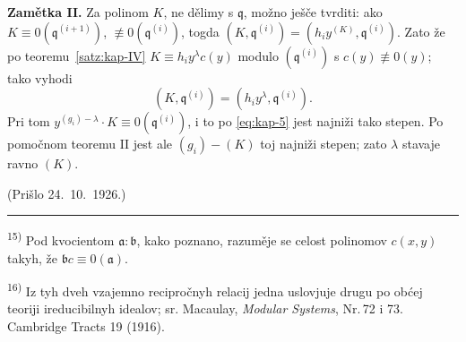 \documentclass[11pt]{article}
\newcommand{\foreign}[1]{#1}
\theoremstyle{plain}
\begin{document}
\textbf{Zamětka II.} Za polinom $K$, ne dělimy s $\mathfrak{q}$,
možno ješče tvrditi: ako
$K \equiv 0(\mathfrak{q}^{(i+1)})$,
$\not\equiv 0(\mathfrak{q}^{(i)})$, togda
$(K, \mathfrak{q}^{(i)}) = (h_{i}y^{(K)}, \mathfrak{q}^{(i)})$.
Zato že po teoremu~\ref{satz:kap-IV}
$K \equiv h_{i}y^{\lambda}c(y)$ modulo
$(\mathfrak{q}^{(i)})$ s $c(y) \not\equiv 0(y)$; tako vyhodi
\[
(K, \mathfrak{q}^{(i)}) = (h_{i}y^{\lambda}, \mathfrak{q}^{(i)}).
\]
Pri tom $y^{(g_{i})-\lambda} \cdot K \equiv 0(\mathfrak{q}^{(i)})$,
i to po \eqref{eq:kap-5} jest najniži tako stepen. Po pomočnom
teoremu II jest ale $(g_{i}) - (K)$ toj najniži stepen; zato
$\lambda$ stavaje ravno $(K)$.

\vfill
\begin{flushright}
(Prišlo 24.\ 10.\ 1926.)
\end{flushright}

\vspace{0.5em}
\noindent\rule{\textwidth}{0.4pt}
\vspace{0.3em}

{\footnotesize
\textsuperscript{15)} Pod kvocientom $\mathfrak{a}:\mathfrak{b}$, kako poznano,
razuměje se celost polinomov $c(x,y)$ takyh, že
$\mathfrak{b}c \equiv 0(\mathfrak{a})$.

\textsuperscript{16)} Iz tyh dveh vzajemno recipročnyh relacij jedna uslovjuje
drugu po obćej teoriji ireducibilnyh idealov; sr. Macaulay,
\textit{\foreign{Modular Systems}}, Nr.\,72 i 73. \foreign{Cambridge Tracts} 19 (1916).
}
\end{document}
